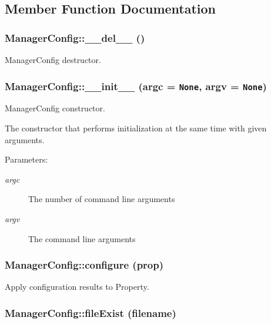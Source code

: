 \subsection{Member Function Documentation}
\subsubsection{\setlength{\rightskip}{0pt plus 5cm}Manager\-Config::\_\-\_\-del\_\-\_\- ()}\label{classManagerConfig_ManagerConfiga1}


Manager\-Config destructor. 

\subsubsection{\setlength{\rightskip}{0pt plus 5cm}Manager\-Config::\_\-\_\-init\_\-\_\- (argc = {\tt None}, argv = {\tt None})}\label{classManagerConfig_ManagerConfiga0}


Manager\-Config constructor. 

The constructor that performs initialization at the same time with given arguments.

\begin{Desc}
\item[Parameters:]
\begin{description}
\item[{\em argc}]The number of command line arguments \item[{\em argv}]The command line arguments\end{description}
\end{Desc}
\subsubsection{\setlength{\rightskip}{0pt plus 5cm}Manager\-Config::configure (prop)}\label{classManagerConfig_ManagerConfiga3}


Apply configuration results to Property. 

\subsubsection{\setlength{\rightskip}{0pt plus 5cm}Manager\-Config::file\-Exist (filename)}\label{classManagerConfig_ManagerConfiga7}


